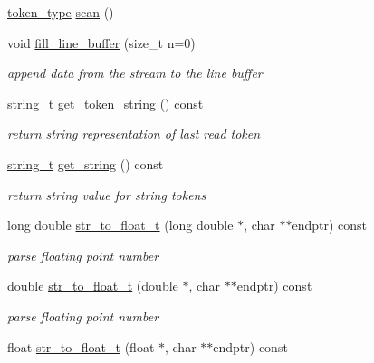 \begin{DoxyCompactItemize}
\item 
\hyperlink{classnlohmann_1_1basic__json_1_1lexer_a96887d6cd131e3d3a85a9d71fbdbcdf7}{token\+\_\+type} \hyperlink{classnlohmann_1_1basic__json_1_1lexer_a94193a4904687939efe186d2ae4397a1}{scan} ()
\item 
void \hyperlink{classnlohmann_1_1basic__json_1_1lexer_adbaca1041a152dc647ff22abc691889f}{fill\+\_\+line\+\_\+buffer} (size\+\_\+t n=0)
\begin{DoxyCompactList}\small\item\em append data from the stream to the line buffer \end{DoxyCompactList}\item 
\hyperlink{classnlohmann_1_1basic__json_ab63e618bbb0371042b1bec17f5891f42}{string\+\_\+t} \hyperlink{classnlohmann_1_1basic__json_1_1lexer_a86b95d76aaf3b599c1530a6de4d1dabf}{get\+\_\+token\+\_\+string} () const 
\begin{DoxyCompactList}\small\item\em return string representation of last read token \end{DoxyCompactList}\item 
\hyperlink{classnlohmann_1_1basic__json_ab63e618bbb0371042b1bec17f5891f42}{string\+\_\+t} \hyperlink{classnlohmann_1_1basic__json_1_1lexer_a18dc059f3a96af88104ca02d919c16b5}{get\+\_\+string} () const 
\begin{DoxyCompactList}\small\item\em return string value for string tokens \end{DoxyCompactList}\item 
long double \hyperlink{classnlohmann_1_1basic__json_1_1lexer_a541f1cd06178fefc5ddde34022852c10}{str\+\_\+to\+\_\+float\+\_\+t} (long double $\ast$, char $\ast$$\ast$endptr) const 
\begin{DoxyCompactList}\small\item\em parse floating point number \end{DoxyCompactList}\item 
double \hyperlink{classnlohmann_1_1basic__json_1_1lexer_a29d53d1c76a58b7f4d1315d44665eab3}{str\+\_\+to\+\_\+float\+\_\+t} (double $\ast$, char $\ast$$\ast$endptr) const 
\begin{DoxyCompactList}\small\item\em parse floating point number \end{DoxyCompactList}\item 
float \hyperlink{classnlohmann_1_1basic__json_1_1lexer_aea092725cd2b01e84126898f080418d6}{str\+\_\+to\+\_\+float\+\_\+t} (float $\ast$, char $\ast$$\ast$endptr) const 
$$
\end{DoxyCompactItemize}
